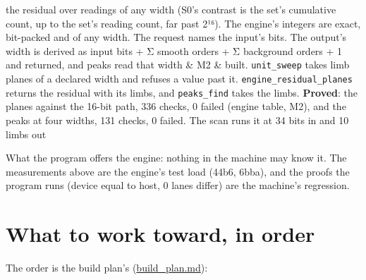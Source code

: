 {\begin{longtable}
the residual over readings of any width (S0's contrast is the set's cumulative count, up to the set's reading count, far past 2¹⁶). The engine's integers are exact, bit-packed and of any width. The request names the input's bits. The output's width is derived as input bits + Σ smooth orders + Σ background orders + 1 and returned, and peaks read that width & M2 & built. \texttt{unit\_\allowbreak{}sweep} takes limb planes of a declared width and refuses a value past it. \texttt{engine\_\allowbreak{}residual\_\allowbreak{}planes} returns the residual with its limbs, and \texttt{peaks\_\allowbreak{}find} takes the limbs. \textbf{Proved}: the planes against the 16-bit path, 336 checks, 0 failed (engine table, M2), and the peaks at four widths, 131 checks, 0 failed. The scan runs it at 34 bits in and 10 limbs out \\
\bottomrule
\end{longtable}
}

What the program offers the engine: nothing in the machine may know it. The measurements above are the engine's test load (44b6, 6bba), and the proofs the program runs (device equal to host, 0 lanes differ) are the machine's regression.

\section{\texorpdfstring{What to work toward, in order}{What to work toward, in order}}

The order is the build plan's (\hyperref[chap:build-plan]{build\_\allowbreak{}plan.md}):

